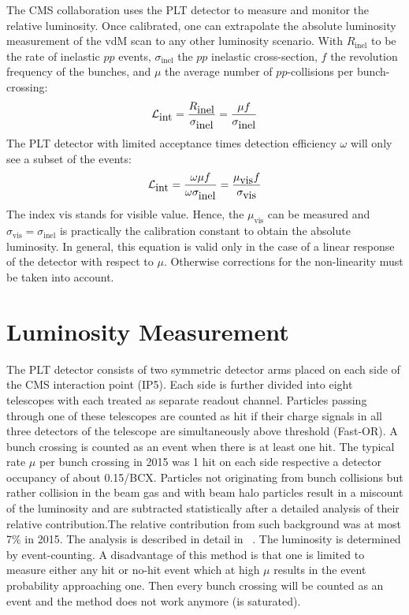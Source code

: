 The CMS collaboration uses the PLT detector to measure and monitor the relative luminosity.
Once calibrated, one can extrapolate the absolute luminosity measurement of the
vdM scan to any other luminosity scenario. With $R_{\mbox{inel}}$ to be the rate of inelastic
$pp$ events, $\sigma_{\mbox{inel}}$ the $pp$ inelastic cross-section, $f$ the revolution frequency
of the bunches, and $\mu$ the average number of $pp$-collisions per bunch-crossing:
\begin{equation}
{\cal L}_{\mbox{int}} = \frac{R_{\mbox{inel}}}{\sigma_{\mbox{inel}}} = \frac{\mu f}{\sigma_{\mbox{inel}}}
\end{equation}
The PLT detector with limited acceptance times detection efficiency $\omega$ will only see a subset of the events:
\begin{equation}
{\cal L}_{\mbox{int}} = \frac{\omega \mu f}{\omega \sigma_{\mbox{inel}}} = \frac{\mu_{\mbox{vis}} f}{\sigma_{\mbox{vis}}}
\end{equation}
The index $\mbox{vis}$ stands for visible value. Hence, the $\mu_{\mbox{vis}}$ can be measured and
${\sigma_{\mbox{vis}}} = {\sigma_{\mbox{inel}}}$ is practically the calibration constant to obtain the absolute luminosity.
In general, this equation is valid only in the case of a linear response of the detector with
respect to $\mu$. Otherwise corrections for the non-linearity must be taken into account.


\section {Luminosity Measurement} \label{sec:lumiMeasurement}
The PLT detector consists of two symmetric detector arms placed on each side of the CMS interaction point (IP5).
Each side is further divided into eight telescopes with each treated as separate readout channel. Particles passing
through one of these telescopes are counted as hit if their charge signals in all three detectors of the
telescope are simultaneously above threshold (Fast-OR). A bunch crossing is counted as an event when there is at least
one hit. The typical rate $\mu$ per bunch crossing in 2015 was 1 hit on each side respective
a detector occupancy of about 0.15/BCX. Particles not originating from bunch collisions but rather
collision in the beam gas and with beam halo particles result in a miscount of the luminosity and
are subtracted statistically after a detailed analysis of their relative contribution.The relative
contribution from such background was at most 7\% in 2015. The analysis is described in detail in ~\cite{PLT:AN-16-002_v3}.
The luminosity is determined by event-counting. A disadvantage of this method is that one is
limited to measure either any hit or no-hit event which at high $\mu$ results in the event probability
approaching one. Then every bunch crossing will be counted as an event and the method does
not work anymore (is saturated).

